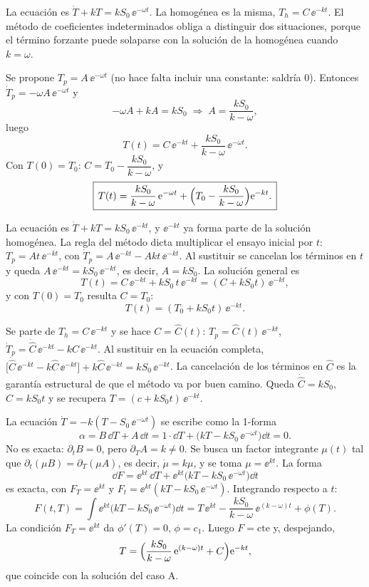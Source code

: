 \begin{solucion}
La ecuación es $\dot T+kT=kS_0\,\ee^{-\omega t}$. La homogénea es la misma, $T_h=C\,\ee^{-kt}$. El método de coeficientes indeterminados obliga a distinguir dos situaciones, porque el término forzante puede solaparse con la solución de la homogénea cuando $k=\omega$.

Se propone $T_p=A\,\ee^{-\omega t}$ (no hace falta incluir una constante: saldría $0$). Entonces $\dot T_p=-\omega A\,\ee^{-\omega t}$ y
\[
  -\omega A+kA=kS_0\;\Longrightarrow\;A=\frac{kS_0}{k-\omega},
\]
luego
\[
  T(t)=C\,\ee^{-kt}+\frac{kS_0}{k-\omega}\,\ee^{-\omega t}.
\]
Con $T(0)=T_0$: $C=T_0-\dfrac{kS_0}{k-\omega}$, y
\begin{equation}
  \boxed{\,T(t)=\frac{kS_0}{k-\omega}\,\mathrm{e}^{-\omega t}+\Bigl(T_0-\frac{kS_0}{k-\omega}\Bigr)\mathrm{e}^{-kt}.\,}
  \label{eq:p2-A}
\end{equation}

La ecuación es $\dot T+kT=kS_0\,\ee^{-kt}$, y $\ee^{-kt}$ ya forma parte de la solución homogénea. La regla del método dicta multiplicar el ensayo inicial por $t$: $T_p=At\,\ee^{-kt}$, con $\dot T_p=A\,\ee^{-kt}-Akt\,\ee^{-kt}$. Al sustituir se cancelan los términos en $t$ y queda $A\,\ee^{-kt}=kS_0\,\ee^{-kt}$, es decir, $A=kS_0$. La solución general es
\[
  T(t)=C\,\ee^{-kt}+kS_0\,t\,\ee^{-kt}=(C+kS_0t)\,\ee^{-kt},
\]
y con $T(0)=T_0$ resulta $C=T_0$:
\begin{equation}
  \boxed{\,T(t)=(T_0+kS_0t)\,\ee^{-kt}.\,}
  \label{eq:p2-B}
\end{equation}

Se parte de $T_h=C\,\ee^{-kt}$ y se hace $C=\hat C(t)$: $T_p=\hat C(t)\,\ee^{-kt}$, $\dot T_p=\dot{\hat C}\,\ee^{-kt}-k\hat C\,\ee^{-kt}$. Al sustituir en la ecuación completa, $\bigl[\dot{\hat C}\,\ee^{-kt}-k\hat C\,\ee^{-kt}\bigr]+k\hat C\,\ee^{-kt}=kS_0\,\ee^{-kt}$. La cancelación de los términos en $\hat C$ es la garantía estructural de que el método va por buen camino. Queda $\dot{\hat C}=kS_0$, $\hat C=kS_0t$ y se recupera $T=(c+kS_0t)\,\ee^{-kt}$.

La ecuación $\dot T=-k(T-S_0\,\ee^{-\omega t})$ se escribe como la 1-forma
\[
  \alpha=B\,\dd T+A\,\dd t=1\cdot\dd T+\bigl(kT-kS_0\,\ee^{-\omega t}\bigr)\dd t=0 .
\]
No es exacta: $\partial_tB=0$, pero $\partial_TA=k\neq0$. Se busca un factor integrante $\mu(t)$ tal que $\partial_t(\mu B)=\partial_T(\mu A)$, es decir, $\dot\mu=k\mu$, y se toma $\mu=\ee^{kt}$. La forma
\[
  \dd F=\ee^{kt}\,\dd T+\ee^{kt}\bigl(kT-kS_0\,\ee^{-\omega t}\bigr)\dd t
\]
es exacta, con $F_T=\ee^{kt}$ y $F_t=\ee^{kt}(kT-kS_0\,\ee^{-\omega t})$. Integrando respecto a $t$:
\[
  F(t,T)=\int\ee^{kt}\bigl(kT-kS_0\,\ee^{-\omega t}\bigr)\dd t=T\,\ee^{kt}-\frac{kS_0}{k-\omega}\,\ee^{(k-\omega)t}+\phi(T).
\]
La condición $F_T=\ee^{kt}$ da $\phi'(T)=0$, $\phi=c_1$. Luego $F=\text{cte}$ y, despejando,
\[
  T=\Bigl(\frac{kS_0}{k-\omega}\,\mathrm{e}^{(k-\omega)t}+C\Bigr)\mathrm{e}^{-kt},
\]
que coincide con la solución del caso A.


\end{solucion}
